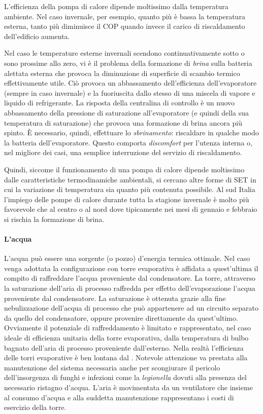 L'efficienza della pompa di calore dipende moltissimo dalla temperatura ambiente. Nel caso invernale, per esempio, quanto più è bassa la temperatura esterna, tanto più diminuisce il COP quando invece il carico di riscaldamento dell'edificio aumenta.

Nel caso le temperature esterne invernali scendono continuativamente sotto o sono prossime allo zero, vi è il problema della formazione di \emph{brina} sulla batteria alettata esterna che provoca la diminuzione di superficie di scambio termico effettivamente utile. Ciò provoca un abbassamento dell'efficienza dell'evaporatore (sempre in caso invernale) e la fuoriuscita dallo stesso di una miscela di vapore e liquido di refrigerante. La risposta della centralina di controllo è un nuovo abbassamento della pressione di saturazione all'evaporatore (e quindi della sua temperatura di saturazione) che provoca una formazione di brina ancora più spinto. È necessario, quindi, effettuare lo \emph{sbrinamento}: riscaldare in qualche modo la batteria dell'evaporatore. Questo comporta \emph{discomfort} per l'utenza interna o, nel migliore dei casi, una semplice interruzione del servizio di riscaldamento.

Quindi, siccome il funzionamento di una pompa di calore dipende moltissimo dalle caratteristiche termodinamiche ambientali, si cercano altre forme di SET in cui la variazione di temperatura sia quanto più contenuta possibile. Al sud Italia l'impiego delle pompe di calore durante tutta la stagione invernale è molto più favorevole che al centro o al nord dove tipicamente nei mesi di gennaio e febbraio si rischia la formazione di brina.

\paragraph{L'acqua}
L'acqua può essere una sorgente (o pozzo) d'energia termica ottimale. Nel caso venga adottata la configurazione con torre evaporativa è affidata a quest'ultima il compito di raffreddare l'acqua proveniente dal condensatore. La torre, attraverso la saturazione dell'aria di processo raffredda per effetto dell'evaporazione l'acqua proveniente dal condensatore. La saturazione è ottenuta grazie alla fine nebulizzazione dell'acqua di processo che può appartenere ad un circuito separato da quello del condensatore, oppure provenire direttamente da quest'ultimo. Ovviamente il potenziale di raffreddamento è limitato e rappresentato, nel caso ideale di efficienza unitaria della torre evaporativa, dalla temperatura di bulbo bagnato dell'aria di processo proveniente dall'esterno. Nella realtà l'efficienza delle torri evaporative è ben lontana dal . Notevole attenzione va prestata alla manutenzione del sistema necessaria anche per scongiurare il pericolo dell'insorgenza di funghi e infezioni come la \emph{legionella} dovuti alla presenza del necessario ristagno d'acqua. L'aria è movimentata da un ventilatore che insieme al consumo d'acqua e alla suddetta manutenzione rappresentano i costi di esercizio della torre.

